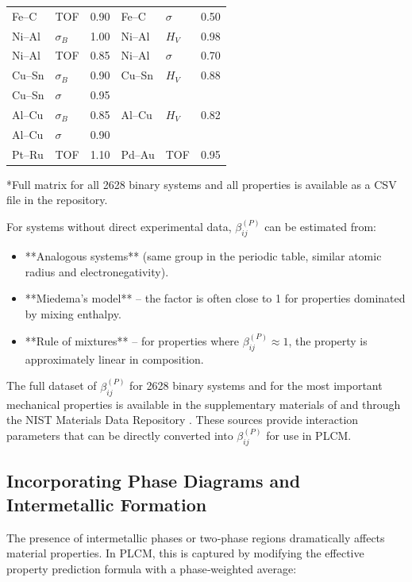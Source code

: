 \documentclass[12pt,a4paper]{article}
\begin{document}
\begin{longtable}{p{1.5cm}p{1.5cm}p{1.2cm}p{1.2cm}p{1.2cm}p{1.2cm}}
		Fe–C  & TOF & 0.90 & Fe–C  & \(\sigma\) & 0.50 \\
		Ni–Al & \(\sigma_B\) & 1.00 & Ni–Al & \(H_V\) & 0.98 \\
		Ni–Al & TOF & 0.85 & Ni–Al & \(\sigma\) & 0.70 \\
		Cu–Sn & \(\sigma_B\) & 0.90 & Cu–Sn & \(H_V\) & 0.88 \\
		Cu–Sn & \(\sigma\) & 0.95 & & & \\
		Al–Cu & \(\sigma_B\) & 0.85 & Al–Cu & \(H_V\) & 0.82 \\
		Al–Cu & \(\sigma\) & 0.90 & & & \\
		Pt–Ru & TOF & 1.10 & Pd–Au & TOF & 0.95 \\
		\bottomrule
	\end{longtable}
	*Full matrix for all 2628 binary systems and all properties is available as a CSV file in the repository.
	
	For systems without direct experimental data, \(\beta_{ij}^{(P)}\) can be estimated from:
	\begin{itemize}
		\item **Analogous systems** (same group in the periodic table, similar atomic radius and electronegativity).
		\item **Miedema’s model** – the factor is often close to 1 for properties dominated by mixing enthalpy.
		\item **Rule of mixtures** – for properties where \(\beta_{ij}^{(P)} \approx 1\), the property is approximately linear in composition.
	\end{itemize}
	
	The full dataset of \(\beta_{ij}^{(P)}\) for 2628 binary systems and for the most important mechanical properties is available in the supplementary materials of \cite{Takeuchi2010} and through the NIST Materials Data Repository \cite{NISTData}. These sources provide interaction parameters that can be directly converted into \(\beta_{ij}^{(P)}\) for use in PLCM.
	
	\subsection{Incorporating Phase Diagrams and Intermetallic Formation}
	\label{subsec:phase-diagrams}
	
	The presence of intermetallic phases or two‑phase regions dramatically affects material properties. In PLCM, this is captured by modifying the effective property prediction formula with a phase‑weighted average:
	
\end{document}
